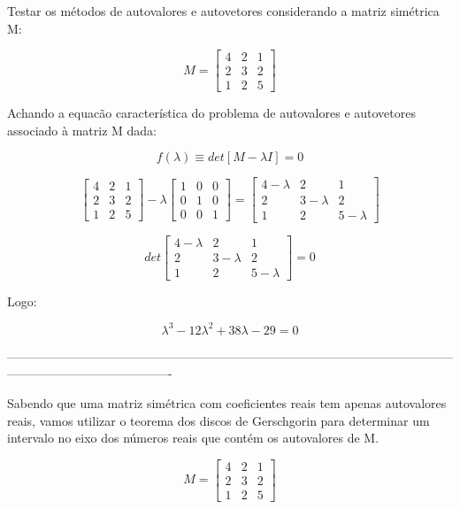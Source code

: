 \begin{example}
 Testar os métodos de autovalores e autovetores considerando a matriz
simétrica M:

\[
M=\left[\begin{array}{ccc}
4 & 2 & 1\\
2 & 3 & 2\\
1 & 2 & 5\end{array}\right]\]


Achando a equacão característica do problema de autovalores e autovetores
associado à matriz M dada:

\[
f(\lambda)\equiv det\left[M-\lambda I\right]=0\]


\[
\left[\begin{array}{ccc}
4 & 2 & 1\\
2 & 3 & 2\\
1 & 2 & 5\end{array}\right]-\lambda\left[\begin{array}{ccc}
1 & 0 & 0\\
0 & 1 & 0\\
0 & 0 & 1\end{array}\right]=\left[\begin{array}{ccc}
4-\lambda & 2 & 1\\
2 & 3-\lambda & 2\\
1 & 2 & 5-\lambda\end{array}\right]\]


\[
det\left[\begin{array}{ccc}
4-\lambda & 2 & 1\\
2 & 3-\lambda & 2\\
1 & 2 & 5-\lambda\end{array}\right]=0\]


Logo:

\[
\lambda^{3}-12\lambda^{2}+38\lambda-29=0\]


\begin{center}
----------------------------------------------------------------------------------------------------------------------------------------------------
\par\end{center}

Sabendo que uma matriz simétrica com coeficientes reais tem apenas
autovalores reais, vamos utilizar o teorema dos discos de Gerschgorin
para determinar um intervalo no eixo dos números reais que contém
os autovalores de M. 

\[
M=\left[\begin{array}{ccc}
4 & 2 & 1\\
2 & 3 & 2\\
1 & 2 & 5\end{array}\right]\]



\end{example}
